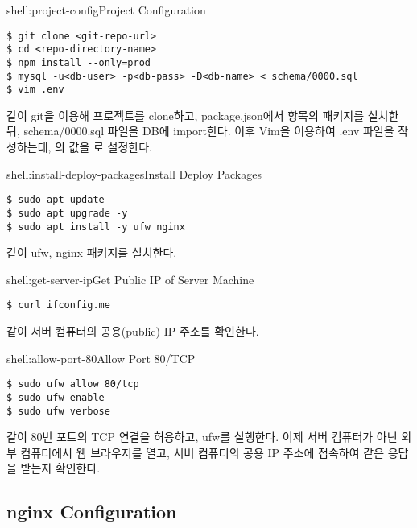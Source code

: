 \begin{shellenv}{shell:project-config}{Project Configuration}\begin{verbatim}
$ git clone <git-repo-url>
$ cd <repo-directory-name>
$ npm install --only=prod
$ mysql -u<db-user> -p<db-pass> -D<db-name> < schema/0000.sql
$ vim .env
\end{verbatim}
\end{shellenv}

\와 같이 git을 이용해 프로젝트를 clone하고, package.json에서  항목의 패키지를 설치한 뒤, schema/0000.sql 파일을 DB에 import한다. 이후 Vim을 이용하여 .env 파일을 작성하는데, 의 값을 로 설정한다.

\begin{shellenv}{shell:install-deploy-packages}{Install Deploy Packages}\begin{verbatim}
$ sudo apt update
$ sudo apt upgrade -y
$ sudo apt install -y ufw nginx
\end{verbatim}
\end{shellenv}

\와 같이 ufw, nginx 패키지를 설치한다.

\begin{shellenv}{shell:get-server-ip}{Get Public IP of Server Machine}\begin{verbatim}
$ curl ifconfig.me
\end{verbatim}
\end{shellenv}

\와 같이 서버 컴퓨터의 공용(public) IP 주소를 확인한다.

\begin{shellenv}{shell:allow-port-80}{Allow Port 80/TCP}\begin{verbatim}
$ sudo ufw allow 80/tcp
$ sudo ufw enable
$ sudo ufw verbose
\end{verbatim}
\end{shellenv}

\과 같이 80번 포트의 TCP 연결을 허용하고, ufw를 실행한다. 이제 서버 컴퓨터가 아닌 외부 컴퓨터에서 웹 브라우저를 열고, 서버 컴퓨터의 공용 IP 주소에 접속하여 \와 같은 응답을 받는지 확인한다.


\subsection*{nginx Configuration}

